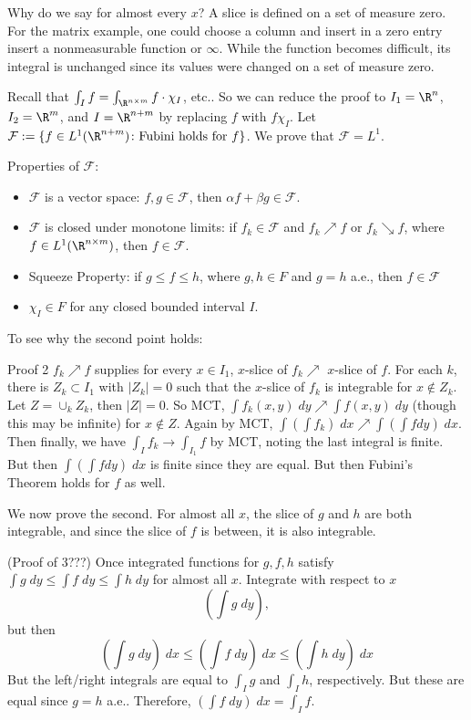 Why do we say for almost every $x$? A slice is defined on a set of measure zero. For the matrix example, one could choose a column and insert in a zero entry insert a nonmeasurable function or $\infty$. While the function becomes difficult, its integral is unchanged since its values were changed on a set of measure zero. 


Recall that $\int_I f= \int_{\R^{n \times m}} f \cdot \chi_I$, etc.. So we can reduce the proof to $I_1= \R^n$, $I_2= \R^m$, and $I= \R^{n+m}$ by replacing $f$ with $f \chi_I$. Let $\mathcal{F}:= \{ f \in L^1( \R^{n+m}) \colon \text{Fubini holds for } f \}$. We prove that $\mathcal{F}=L^1$. 

Properties of $\mathcal{F}$:
        \begin{itemize}
        \item $\mathcal{F}$ is a vector space: $f,g \in \mathcal{F}$, then $\alpha f + \beta g \in \mathcal{F}$.
        \item $\mathcal{F}$ is closed under monotone limits: if $f_k \in \mathcal{F}$ and $f_k \nearrow f$ or $f_k \searrow f$, where $f \in L^1(\R^{n \times m})$, then $f \in \mathcal{F}$.
        \item Squeeze Property: if $g \leq f \leq h$, where $g,h \in F$ and $g=h$ a.e., then $f \in \mathcal{F}$
        \item $\chi_I \in F$ for any closed bounded interval $I$. 
        \end{itemize}





To see why the second point holds: 

Proof 2 $f_k \nearrow f$ supplies for every $x \in I_1$, $x$-slice of $f_k \nearrow$ $x$-slice of $f$. For each $k$, there is $Z_k \subset I_1$ with $|Z_k|=0$ such that the $x$-slice of $f_k$ is integrable for $x \notin Z_k$. Let $Z= \cup_k Z_k$, then $|Z|=0$. So MCT, $\int f_k(x,y) \; dy \nearrow \int f(x,y) \; dy$ (though this may be infinite) for $x \notin Z$. Again by MCT, $\int (\int f_k) \; dx \nearrow \int (\int f dy) \; dx$. Then finally, we have $\int_I f_k \to \int_{I_1} f$ by MCT, noting the last integral is finite. But then $\int (\int f dy) \; dx$ is finite since they are equal. But then Fubini's Theorem holds for $f$ as well. 

We now prove the second. For almost all $x$, the slice of $g$ and $h$ are both integrable, and since the slice of $f$ is between, it is also integrable. 


(Proof of 3???) Once integrated functions for $g, f, h$ satisfy $\int g \; dy \leq \int f \; dy \leq \int h \; dy$ for almost all $x$. Integrate with respect to $x$
	\[
	\left( \int g \; dy \right),
	\]
but then 
	\[
	\left( \int g \; dy \right) \; dx \leq \left( \int f \; dy \right) \; dx  \leq \left( \int h \; dy \right) \; dx 
	\]
But the left/right integrals are equal to $\int_I g$ and $\int_I h$, respectively. But these are equal since $g=h$ a.e.. Therefore, $\left( \int f \; dy \right) \; dx= \int_I f$.


